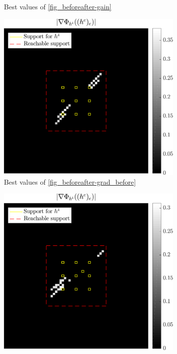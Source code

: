 \begin{figure}[!ht]
\begin{subfigure}[b]{0.32\linewidth}
\caption{Best values of \ref{fig_beforeafter-gain}}\label{fig_beforeafter-gain_best}
\end{subfigure}
\begin{subfigure}[b]{0.32\linewidth}\centering
\includegraphics[width=\linewidth]{figures/before_after/xp_128x128_sc2_angl1_K3_S3_node4before_partgrad4_bestvalues.pdf}
\caption{Best values of \ref{fig_beforeafter-grad_before}}\label{fig_beforeafter-grad_before_best}
\end{subfigure}
\begin{subfigure}[b]{0.32\linewidth}\centering
\includegraphics[width=\linewidth]{figures/before_after/xp_128x128_sc2_angl1_K3_S3_node4after_partgrad4_bestvalues.pdf}

\end{subfigure}
\end{figure}
